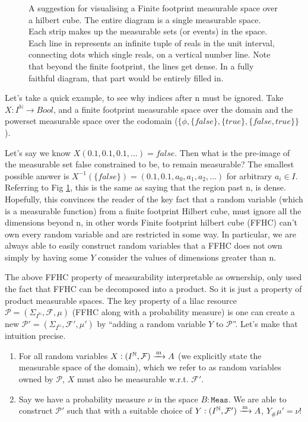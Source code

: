 \begin{figure}[tb]
  \centering

\caption{A suggestion for visualising a Finite footprint measurable space over a hilbert cube. The entire diagram is a single measurable space. Each strip
makes up the measurable sets (or events) in the space. Each line in represents an infinite tuple of reals in the unit interval, connecting dots which single reals,
on a vertical number line. Note that beyond the finite footprint, the lines get dense. In a fully faithful diagram, that part would be entirely filled in.}
\label{fig:hc}
\end{figure}


Let's take a quick example, to see why indices after n must be ignored. Take $X : I^\mathbb{N} \to Bool$, and a finite footprint measurable space over the domain
and the powerset measurable space over the codomain ($\{\phi, \{false\}, \{true\}, \{false, true\}\}$).

Let's say we know $X(0.1, 0.1, 0.1, \ldots) = false$. 
Then what is the pre-image of the measurable set {false} constrained to be, to remain measurable? The smallest possible answer is $X^{-1} (\{false\}) = (0.1, 0.1, a_0, a_1, a_2, \ldots)$
for arbitrary $a_i \in I$. Referring to Fig \ref{fig:hc}, this is the same as saying that the region past n, is dense. Hopefully, this convinces the reader
of the key fact that a random variable (which is a measurable function) from a finite footprint Hilbert cube, must ignore all the dimensions beyond n, in
other words Finite footprint hilbert cube (FFHC) can't own every random variable and are restricted in some way. In particular, we are always able to easily construct
random variables that a FFHC does not own simply by having some $Y$ consider the values of dimensions greater than n.

The above FFHC property of measurability interpretable as ownership, only used the fact that FFHC can be decomposed into a product. So it is just
a property of product measurable spaces. The key property of a lilac resource $\mathcal{P} = (\Sigma_{I^\mathbb{N}}, \mathcal{F}, \mu)$ (FFHC along with a probability measure) is one can create
a new $\mathcal{P'} = (\Sigma_{I^\mathbb{N}}, \mathcal{F'}, \mu')$ by ``adding a random variable $Y$ to $\mathcal{P}$''.
Let's make that intuition precise.

\begin{enumerate}
\item For all random variables $X : (I^\mathbb{N}, \mathcal{F}) \xrightarrow{\,\mathrm{m}\,} A$ (we explicitly state the measurable space of
the domain), which we refer to as random variables owned by $\mathcal{P}$, $X$ must also be measurable w.r.t. $\mathcal{F'}$.
\item Say we have a probability
measure $\nu$ in the space $B : \texttt{Meas}$. We are able to construct $\mathcal{P'}$ such that with a suitable choice of $Y : (I^\mathbb{N}, \mathcal{F'}) \xrightarrow{\,\mathrm{m}\,} A$,
$Y_\#\mu' = \nu$!
\end{enumerate}

